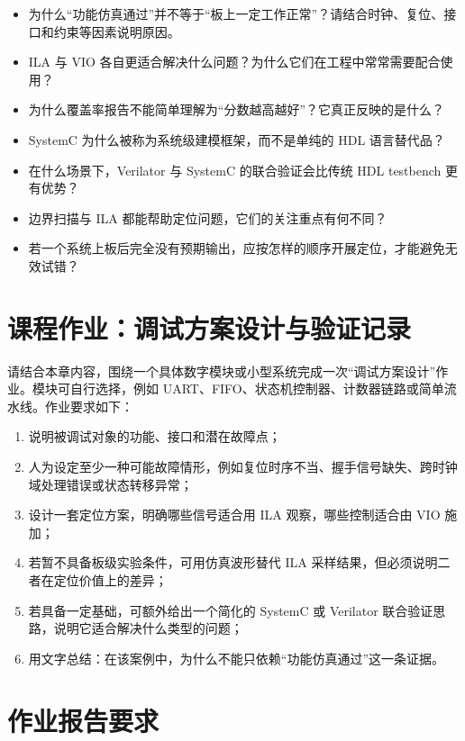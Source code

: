 \begin{itemize}
\tightlist
\item
  为什么``功能仿真通过''并不等于``板上一定工作正常''？请结合时钟、复位、接口和约束等因素说明原因。
\item
  ILA 与 VIO
  各自更适合解决什么问题？为什么它们在工程中常常需要配合使用？
\item
  为什么覆盖率报告不能简单理解为``分数越高越好''？它真正反映的是什么？
\item
  SystemC 为什么被称为系统级建模框架，而不是单纯的 HDL 语言替代品？
\item
  在什么场景下，Verilator 与 SystemC 的联合验证会比传统 HDL testbench
  更有优势？
\item
  边界扫描与 ILA 都能帮助定位问题，它们的关注重点有何不同？
\item
  若一个系统上板后完全没有预期输出，应按怎样的顺序开展定位，才能避免无效试错？
\end{itemize}

\section{课程作业：调试方案设计与验证记录}\label{ux8bfeux7a0bux4f5cux4e1aux8c03ux8bd5ux65b9ux6848ux8bbeux8ba1ux4e0eux9a8cux8bc1ux8bb0ux5f55}

请结合本章内容，围绕一个具体数字模块或小型系统完成一次``调试方案设计''作业。模块可自行选择，例如
UART、FIFO、状态机控制器、计数器链路或简单流水线。作业要求如下：

\begin{enumerate}
\def\labelenumi{\arabic{enumi}.}
\tightlist
\item
  说明被调试对象的功能、接口和潜在故障点；
\item
  人为设定至少一种可能故障情形，例如复位时序不当、握手信号缺失、跨时钟域处理错误或状态转移异常；
\item
  设计一套定位方案，明确哪些信号适合用 ILA 观察，哪些控制适合由 VIO
  施加；
\item
  若暂不具备板级实验条件，可用仿真波形替代 ILA
  采样结果，但必须说明二者在定位价值上的差异；
\item
  若具备一定基础，可额外给出一个简化的 SystemC 或 Verilator
  联合验证思路，说明它适合解决什么类型的问题；
\item
  用文字总结：在该案例中，为什么不能只依赖``功能仿真通过''这一条证据。
\end{enumerate}

\section{作业报告要求}\label{ux4f5cux4e1aux62a5ux544aux8981ux6c42}

